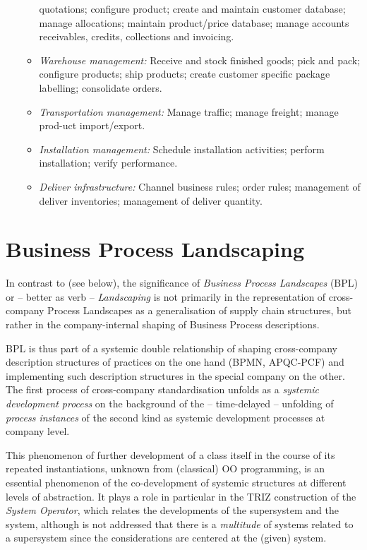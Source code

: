 \documentclass[11pt,a4paper]{article}
\begin{document}
\begin{itemize}
\begin{itemize}
    quotations; configure product; create and maintain customer database;
    manage allocations; maintain product/price database; manage accounts
    receivables, credits, collections and invoicing.
  \item \emph{Warehouse management:} Receive and stock finished goods; pick
    and pack; configure products; ship products; create customer specific
    package labelling; consolidate orders.
  \item \emph{Transportation management:} Manage traffic; manage freight;
    manage prod-uct import/export.
  \item \emph{Installation management:} Schedule installation activities;
    perform installation; verify performance.
  \item \emph{Deliver infrastructure:} Channel business rules; order rules;
    management of deliver inventories; management of deliver quantity.
  \end{itemize}
\end{itemize}

\section{Business Process Landscaping}

In contrast to \cite{FordMouzas2013} (see below), the significance of
\emph{Business Process Landscapes} (BPL) or -- better as verb --
\emph{Landscaping} is not primarily in the representation of cross-company
Process Landscapes as a generalisation of supply chain structures, but rather
in the company-internal shaping of Business Process descriptions.

BPL is thus part of a systemic double relationship of shaping cross-company
description structures of practices on the one hand (BPMN, APQC-PCF) and
implementing such description structures in the special company on the other.
The first process of cross-company standardisation unfolds as a \emph{systemic
  development process} on the background of the -- time-delayed -- unfolding
of \emph{process instances} of the second kind as systemic development
processes at company level.

This phenomenon of further development of a class itself in the course of its
repeated instantiations, unknown from (classical) OO programming, is an
essential phenomenon of the co-development of systemic structures at different
levels of abstraction. It plays a role in particular in the TRIZ construction
of the \emph{System Operator}, which relates the developments of the
supersystem and the system, although is not addressed that there is a
\emph{multitude} of systems related to a supersystem since the considerations
are centered at the (given) system.
\end{document}

